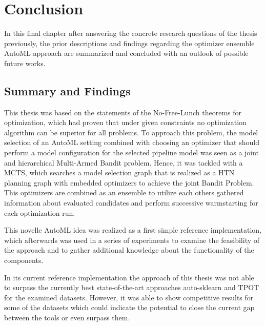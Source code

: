 %
\chapter{Conclusion}
\label{sec:conclusion}
In this final chapter after answering the concrete research questions of the thesis previously, the prior descriptions and findings regarding the optimizer ensemble AutoML approach are summarized and concluded with an outlook of possible future works.

\section{Summary and Findings}
\label{sec:conclusion:summary}
This thesis was based on the statements of the No-Free-Lunch theorems for optimization, which had proven that under given constraints no optimization algorithm can be superior for all problems.
To approach this problem, the model selection of an AutoML setting combined with choosing an optimizer that should perform a model configuration for the selected pipeline model was seen as a joint and hierarchical Multi-Armed Bandit problem.
Hence, it was tackled with a MCTS, which searches a model selection graph that is realized as a HTN planning graph with embedded optimizers to achieve the joint Bandit Problem.
This optimizers are combined as an ensemble to utilize each others gathered information about evaluated candidates and perform successive warmstarting for each optimization run.

This novelle AutoML idea was realized as a first simple reference implementation, which afterwards was used in a series of experiments to examine the feasibility of the approach and to gather additional knowledge about the functionality of the components.

In its current reference implementation the approach of this thesis was not able to surpass the currently best state-of-the-art approaches auto-sklearn and TPOT for the examined datasets.
However, it was able to show competitive results for some of the datasets which could indicate the potential to close the current gap between the tools or even surpass them.

